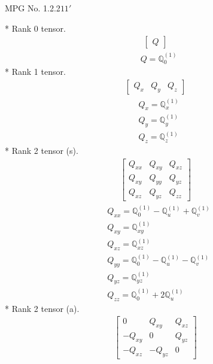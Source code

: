 \documentclass[fleqn,8pt,landscape]{jsarticle}
\begin{document}
\setcounter{MaxMatrixCols}{32}

\renewcommand{\tablename}{Table~}
\renewcommand{\figurename}{Figure~}
\begin{center}
\LARGE
MPG No. 1.2.2\quad$11'$
\end{center}
* Rank 0 tensor.
\begin{align*}
\begin{bmatrix} Q \end{bmatrix}
\end{align*}
\begin{align*}
& Q = \mathbb{Q}_{0}^{(1)}
\end{align*}
* Rank 1 tensor.
\begin{align*}
\begin{bmatrix} Q_{x} & Q_{y} & Q_{z} \end{bmatrix}
\end{align*}
\begin{align*}
& Q_{x} = \mathbb{Q}_{x}^{(1)} \\
& Q_{y} = \mathbb{Q}_{y}^{(1)} \\
& Q_{z} = \mathbb{Q}_{z}^{(1)}
\end{align*}
* Rank 2 tensor (s).
\begin{align*}
\begin{bmatrix} Q_{xx} & Q_{xy} & Q_{xz} \\ Q_{xy} & Q_{yy} & Q_{yz} \\ Q_{xz} & Q_{yz} & Q_{zz} \end{bmatrix}
\end{align*}
\begin{align*}
& Q_{xx} = \mathbb{Q}_{0}^{(1)} - \mathbb{Q}_{u}^{(1)} + \mathbb{Q}_{v}^{(1)} \\
& Q_{xy} = \mathbb{Q}_{xy}^{(1)} \\
& Q_{xz} = \mathbb{Q}_{xz}^{(1)} \\
& Q_{yy} = \mathbb{Q}_{0}^{(1)} - \mathbb{Q}_{u}^{(1)} - \mathbb{Q}_{v}^{(1)} \\
& Q_{yz} = \mathbb{Q}_{yz}^{(1)} \\
& Q_{zz} = \mathbb{Q}_{0}^{(1)} + 2 \mathbb{Q}_{u}^{(1)}
\end{align*}
* Rank 2 tensor (a).
\begin{align*}
\begin{bmatrix} 0 & Q_{xy} & Q_{xz} \\ - Q_{xy} & 0 & Q_{yz} \\ - Q_{xz} & - Q_{yz} & 0 \end{bmatrix}
\end{align*}
\end{document}
